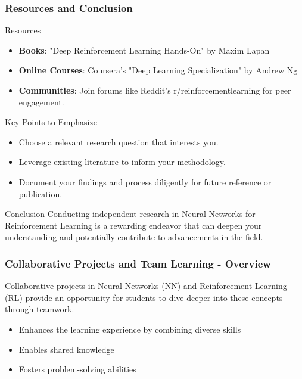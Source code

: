 \documentclass[aspectratio=169]{beamer}
\begin{document}
\begin{frame}[fragile]
    \frametitle{Resources and Conclusion}
    \begin{block}{Resources}
        \begin{itemize}
            \item \textbf{Books}: "Deep Reinforcement Learning Hands-On" by Maxim Lapan
            \item \textbf{Online Courses}: Coursera’s "Deep Learning Specialization" by Andrew Ng
            \item \textbf{Communities}: Join forums like Reddit’s r/reinforcementlearning for peer engagement.
        \end{itemize}
    \end{block}

    \begin{block}{Key Points to Emphasize}
        \begin{itemize}
            \item Choose a relevant research question that interests you.
            \item Leverage existing literature to inform your methodology.
            \item Document your findings and process diligently for future reference or publication.
        \end{itemize}
    \end{block}

    \begin{block}{Conclusion}
        Conducting independent research in Neural Networks for Reinforcement Learning is a rewarding endeavor that can deepen your understanding and potentially contribute to advancements in the field.
    \end{block}
\end{frame}

\begin{frame}[fragile]
    \frametitle{Collaborative Projects and Team Learning - Overview}
    Collaborative projects in Neural Networks (NN) and Reinforcement Learning (RL) provide an opportunity for students to dive deeper into these concepts through teamwork. 

    \begin{itemize}
        \item Enhances the learning experience by combining diverse skills
        \item Enables shared knowledge
        \item Fosters problem-solving abilities
    \end{itemize}
\end{frame}
\end{document}
